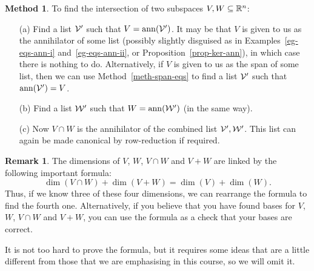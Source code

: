 \documentclass[reqno]{amsart}
\theoremstyle{definition}
\newtheorem{remark}[theorem]{Remark}
\newtheorem{method}[theorem]{Method}
\begin{document}
\begin{method}\label{meth-find-meet}
 To find the intersection of two subspaces $V,W\subseteq{\mathbb{R}}^n$:
 \begin{itemize}
  \item[(a)] Find a list $\mathcal{V}'$ such that $V=\operatorname{ann}(\mathcal{V}')$.  It may be
   that $V$ is given to us as the annihilator of some list (possibly
   slightly disguised as in Examples~\ref{eg-eqs-ann-i}
   and~\ref{eg-eqs-ann-ii}, or Proposition~\ref{prop-ker-ann}), in
   which case there is nothing to do.  Alternatively, if $V$ is given
   to us as the span of some list, then we can use
   Method~\ref{meth-span-eqs} to find a list $\mathcal{V}'$ such that
   $\operatorname{ann}(\mathcal{V}')=V$. 
  \item[(b)] Find a list $\mathcal{W}'$ such that $W=\operatorname{ann}(\mathcal{W}')$ (in the same
   way).
  \item[(c)] Now $V\cap W$ is the annihilator of the combined list
   $\mathcal{V}',\mathcal{W}'$.  This list can again be made canonical by row-reduction
   if required.
 \end{itemize}
\end{method}

\begin{remark}\label{rem-dim-formula}
 The dimensions of $V$, $W$, $V\cap W$ and $V+W$ are linked by the
 following important formula:
 \[ \dim(V\cap W) + \dim(V+W) = \dim(V) + \dim(W). \]
 Thus, if we know three of these four dimensions, we can rearrange the
 formula to find the fourth one.  Alternatively, if you believe that
 you have found bases for $V$, $W$, $V\cap W$ and $V+W$, you can use
 the formula as a check that your bases are correct.

 It is not too hard to prove the formula, but it requires some ideas
 that are a little different from those that we are emphasising in
 this course, so we will omit it.
\end{remark}
\end{document}
